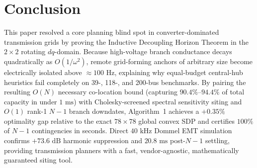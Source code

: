 \documentclass[10pt,twocolumn]{article}
\begin{document}
\section{Conclusion}
This paper resolved a core planning blind spot in converter-dominated transmission grids by proving the Inductive Decoupling Horizon Theorem in the $2\times 2$ rotating $dq$-domain. Because high-voltage branch conductance decays quadratically as $O(1/\omega^2)$, remote grid-forming anchors of arbitrary size become electrically isolated above $\approx 100\text{ Hz}$, explaining why equal-budget central-hub heuristics fail completely on 39-, 118-, and 200-bus benchmarks. By pairing the resulting $O(N)$ necessary co-location bound (capturing $90.4\%$--$94.4\%$ of total capacity in under $1\text{ ms}$) with Cholesky-screened spectral sensitivity siting and $O(1)$ rank-1 $N-1$ branch downdates, Algorithm~1 achieves a $+0.35\%$ optimality gap relative to the exact $78\times 78$ global convex SDP and certifies $100\%$ of $N-1$ contingencies in seconds. Direct $40\text{ kHz}$ Dommel EMT simulation confirms $+73.6\text{ dB}$ harmonic suppression and $20.8\text{ ms}$ post-$N-1$ settling, providing transmission planners with a fast, vendor-agnostic, mathematically guaranteed siting tool.
\end{document}
